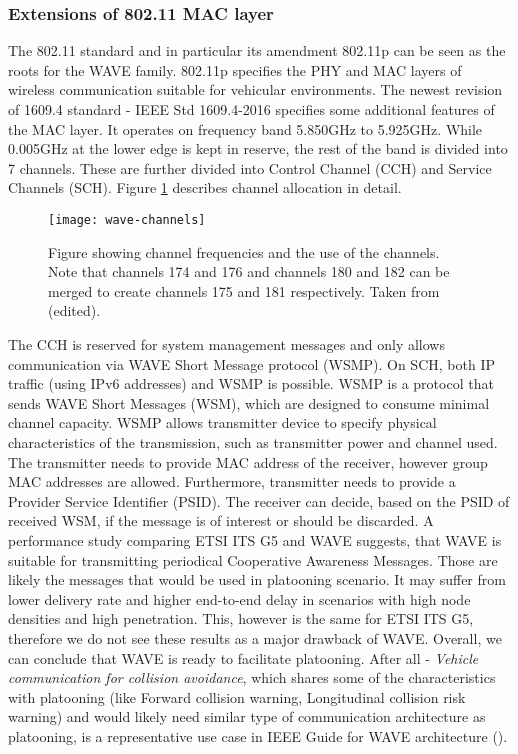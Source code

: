 \subsubsection*{Extensions of 802.11 MAC layer} 
The 802.11 standard and in particular its amendment 802.11p can be seen as the roots for the WAVE family. 802.11p specifies the PHY and MAC layers of wireless communication suitable for vehicular environments. The newest revision of 1609.4 standard - IEEE Std 1609.4-2016 specifies some additional features of the MAC layer. It operates on frequency band 5.850GHz to 5.925GHz. While 0.005GHz at the lower edge is kept in reserve, the rest of the band is divided into 7 channels. These are further divided into Control Channel (CCH) and Service Channels (SCH). Figure \ref{fig:wave-channels} describes channel allocation in detail.\par
% 
\begin{figure}[ht]
    \centering
    \texttt{[image: wave-channels]}
    \caption{Figure showing channel frequencies and the use of the channels. Note that channels 174 and 176 and channels 180 and 182 can be merged to create channels 175 and 181 respectively. Taken from \cite[p. 20]{VehicularTechnologySociety2014IEEEArchitecture} (edited).}
    \label{fig:wave-channels}
\end{figure}
% 
The CCH is reserved for system management messages and only allows communication via WAVE Short Message protocol (WSMP). On SCH, both IP traffic (using IPv6 addresses) and WSMP is possible. WSMP is a protocol that sends WAVE Short Messages (WSM), which are designed to consume minimal channel capacity. WSMP allows transmitter device to specify physical characteristics of the transmission, such as transmitter power and channel used. The transmitter needs to provide MAC address of the receiver, however group MAC addresses are allowed. Furthermore, transmitter needs to provide a Provider Service Identifier (PSID)\footnotemark. The receiver can decide, based on the PSID of received WSM, if the message is of interest or should be discarded.
% 
% 
A performance study comparing ETSI ITS G5 and WAVE\cite{Eckhoff2013AWAVE} suggests, that WAVE is suitable for transmitting periodical Cooperative Awareness Messages. Those are likely the messages that would be used in platooning scenario. It may suffer from lower delivery rate and higher end-to-end delay in scenarios with high node densities and high penetration. This, however is the same for ETSI ITS G5, therefore we do not see these results as a major drawback of WAVE. Overall, we can conclude that WAVE is ready to facilitate platooning. After all - \emph{Vehicle communication for collision avoidance}, which shares some of the characteristics with platooning (like Forward collision warning, Longitudinal collision risk warning) and would likely need similar type of communication architecture as platooning, is a representative use case in IEEE Guide for WAVE architecture (\cite{VehicularTechnologySociety2014IEEEArchitecture}).